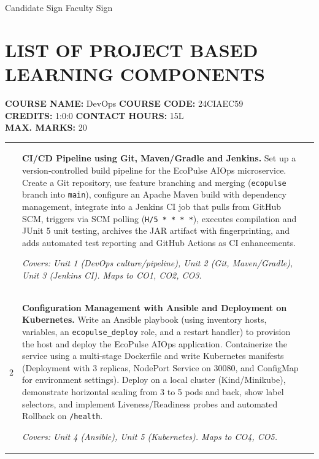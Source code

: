 \documentclass[12pt,a4paper]{article}
\newcommand{\sizeTwelve}{\fontsize{12pt}{14.5pt}\selectfont}  %
\begin{document}
\noindent
{\sizeTwelve Candidate Sign \hfill Faculty Sign \par}

\newpage
\pagestyle{plain}

\section*{LIST OF PROJECT BASED LEARNING COMPONENTS}

\noindent
{\sizeTwelve
\textbf{COURSE NAME:} DevOps \hfill \textbf{COURSE CODE:} 24CIAEC59 \\
\textbf{CREDITS:} 1:0:0 \hfill \textbf{CONTACT HOURS:} 15L \\
\textbf{MAX. MARKS:} 20
\par}

\vspace{0.6cm}

{\sizeTwelve
\setlength{\tabcolsep}{4pt}
\renewcommand{\arraystretch}{1.25}
\begin{longtable}{|>{\centering\arraybackslash}m{1.2cm}|>{\raggedright\arraybackslash}p{10.6cm}|>{\centering\arraybackslash}m{1.8cm}|}
\hline
\multicolumn{1}{|c|}{\textbf{Sl. No}} &
\multicolumn{1}{c|}{\textbf{Description}} &
\multicolumn{1}{c|}{\textbf{Marks}} \\
\hline
\endhead

1 &
\textbf{CI/CD Pipeline using Git, Maven/Gradle and Jenkins.}
Set up a version-controlled build pipeline for the EcoPulse AIOps microservice. Create a Git repository, use feature branching and merging (\texttt{ecopulse} branch into \texttt{main}), configure an Apache Maven build with dependency management, integrate into a Jenkins CI job that pulls from GitHub SCM, triggers via SCM polling (\texttt{H/5 * * * *}), executes compilation and JUnit 5 unit testing, archives the JAR artifact with fingerprinting, and adds automated test reporting and GitHub Actions as CI enhancements.

\textit{Covers: Unit 1 (DevOps culture/pipeline), Unit 2 (Git, Maven/Gradle), Unit 3 (Jenkins CI). Maps to CO1, CO2, CO3.}
& 10 \\
\hline

2 &
\textbf{Configuration Management with Ansible and Deployment on Kubernetes.}
Write an Ansible playbook (using inventory hosts, variables, an \texttt{ecopulse\_deploy} role, and a restart handler) to provision the host and deploy the EcoPulse AIOps application. Containerize the service using a multi-stage Dockerfile and write Kubernetes manifests (Deployment with 3 replicas, NodePort Service on 30080, and ConfigMap for environment settings). Deploy on a local cluster (Kind/Minikube), demonstrate horizontal scaling from 3 to 5 pods and back, show label selectors, and implement Liveness/Readiness probes and automated Rollback on \texttt{/health}.

\textit{Covers: Unit 4 (Ansible), Unit 5 (Kubernetes). Maps to CO4, CO5.}
& 10 \\
\hline

\end{longtable}
\par}
\end{document}
